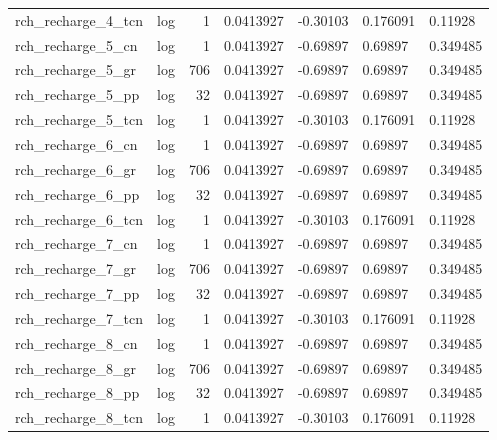 \documentclass{article}
\begin{document}
\begin{center}
\begin{landscape}
\begin{longtable}{llrllll}
 rch\_recharge\_4\_tcn &       log &      1 &      0.0413927 &       -0.30103 &       0.176091 &            0.11928 \\
  rch\_recharge\_5\_cn &       log &      1 &      0.0413927 &       -0.69897 &        0.69897 &           0.349485 \\
  rch\_recharge\_5\_gr &       log &    706 &      0.0413927 &       -0.69897 &        0.69897 &           0.349485 \\
  rch\_recharge\_5\_pp &       log &     32 &      0.0413927 &       -0.69897 &        0.69897 &           0.349485 \\
 rch\_recharge\_5\_tcn &       log &      1 &      0.0413927 &       -0.30103 &       0.176091 &            0.11928 \\
  rch\_recharge\_6\_cn &       log &      1 &      0.0413927 &       -0.69897 &        0.69897 &           0.349485 \\
  rch\_recharge\_6\_gr &       log &    706 &      0.0413927 &       -0.69897 &        0.69897 &           0.349485 \\
  rch\_recharge\_6\_pp &       log &     32 &      0.0413927 &       -0.69897 &        0.69897 &           0.349485 \\
 rch\_recharge\_6\_tcn &       log &      1 &      0.0413927 &       -0.30103 &       0.176091 &            0.11928 \\
  rch\_recharge\_7\_cn &       log &      1 &      0.0413927 &       -0.69897 &        0.69897 &           0.349485 \\
  rch\_recharge\_7\_gr &       log &    706 &      0.0413927 &       -0.69897 &        0.69897 &           0.349485 \\
  rch\_recharge\_7\_pp &       log &     32 &      0.0413927 &       -0.69897 &        0.69897 &           0.349485 \\
 rch\_recharge\_7\_tcn &       log &      1 &      0.0413927 &       -0.30103 &       0.176091 &            0.11928 \\
  rch\_recharge\_8\_cn &       log &      1 &      0.0413927 &       -0.69897 &        0.69897 &           0.349485 \\
  rch\_recharge\_8\_gr &       log &    706 &      0.0413927 &       -0.69897 &        0.69897 &           0.349485 \\
  rch\_recharge\_8\_pp &       log &     32 &      0.0413927 &       -0.69897 &        0.69897 &           0.349485 \\
 rch\_recharge\_8\_tcn &       log &      1 &      0.0413927 &       -0.30103 &       0.176091 &            0.11928 \\

\end{longtable}
\end{landscape}
\end{center}
\end{document}
